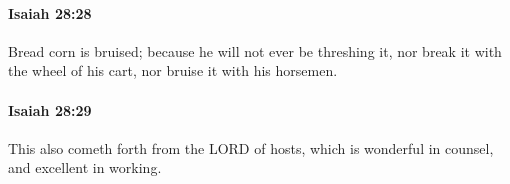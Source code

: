 		\paragraph{Isaiah 28:28} %
			\label{ISAIAH-28-28}

			Bread corn is bruised; because he will not ever be threshing it, nor break it with the wheel of his cart, nor bruise it with his horsemen.


		\paragraph{Isaiah 28:29} %
			\label{ISAIAH-28-29}

			This also cometh forth from the LORD of hosts, which is wonderful in counsel, and excellent in working.

